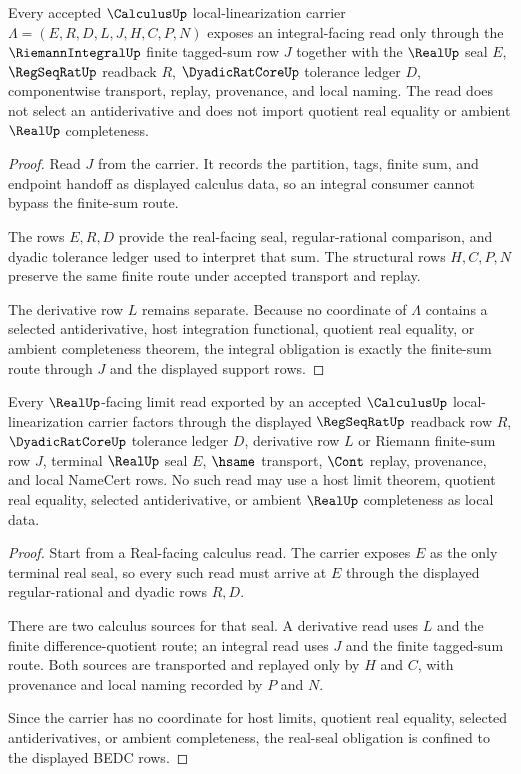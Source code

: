 \begin{theorem}
\label{thm:calculus-integral-finite-sum-obligation}
Every accepted $\CalculusUp$ local-linearization carrier
$\Lambda=(E,R,D,L,J,H,C,P,N)$ exposes an integral-facing read only through the
$\RiemannIntegralUp$ finite tagged-sum row $J$ together with the $\RealUp$
seal $E$, $\RegSeqRatUp$ readback $R$, $\DyadicRatCoreUp$ tolerance ledger
$D$, componentwise transport, replay, provenance, and local naming. The read
does not select an antiderivative and does not import quotient real equality
or ambient $\RealUp$ completeness.
\end{theorem}
\begin{proof}
Read $J$ from the carrier. It records the partition, tags, finite sum, and
endpoint handoff as displayed calculus data, so an integral consumer cannot
bypass the finite-sum route.

The rows $E,R,D$ provide the real-facing seal, regular-rational comparison,
and dyadic tolerance ledger used to interpret that sum. The structural rows
$H,C,P,N$ preserve the same finite route under accepted transport and replay.

The derivative row $L$ remains separate. Because no coordinate of
$\Lambda$ contains a selected antiderivative, host integration functional,
quotient real equality, or ambient completeness theorem, the integral
obligation is exactly the finite-sum route through $J$ and the displayed
support rows.
\end{proof}

\begin{theorem}
\label{thm:calculus-limit-real-seal-obligation}
Every $\RealUp$-facing limit read exported by an accepted $\CalculusUp$
local-linearization carrier factors through the displayed $\RegSeqRatUp$
readback row $R$, $\DyadicRatCoreUp$ tolerance ledger $D$, derivative row $L$
or Riemann finite-sum row $J$, terminal $\RealUp$ seal $E$, $\hsame$
transport, $\Cont$ replay, provenance, and local NameCert rows. No such read
may use a host limit theorem, quotient real equality, selected antiderivative,
or ambient $\RealUp$ completeness as local data.
\end{theorem}
\begin{proof}
Start from a Real-facing calculus read. The carrier exposes $E$ as the only
terminal real seal, so every such read must arrive at $E$ through the displayed
regular-rational and dyadic rows $R,D$.

There are two calculus sources for that seal. A derivative read uses $L$ and
the finite difference-quotient route; an integral read uses $J$ and the
finite tagged-sum route. Both sources are transported and replayed only by
$H$ and $C$, with provenance and local naming recorded by $P$ and $N$.

Since the carrier has no coordinate for host limits, quotient real equality,
selected antiderivatives, or ambient completeness, the real-seal obligation is
confined to the displayed BEDC rows.
\end{proof}

